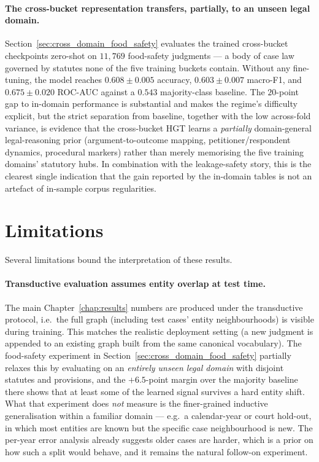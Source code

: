 \paragraph{The cross-bucket representation transfers, partially, to
an unseen legal domain.} Section~\ref{sec:cross_domain_food_safety}
evaluates the trained cross-bucket checkpoints zero-shot on
$11{,}769$ food-safety judgments --- a body of case law governed by
statutes none of the five training buckets contain.  Without any
fine-tuning, the model reaches $0.608\pm0.005$ accuracy,
$0.603\pm0.007$ macro-F1, and $0.675\pm0.020$ ROC-AUC against a
$0.543$ majority-class baseline.  The $20$-point gap to in-domain
performance is substantial and makes the regime's difficulty
explicit, but the strict separation from baseline, together with the
low across-fold variance, is evidence that the cross-bucket HGT
learns a \emph{partially} domain-general legal-reasoning prior
(argument-to-outcome mapping, petitioner/respondent dynamics,
procedural markers) rather than merely memorising the five training
domains' statutory hubs.  In combination with the leakage-safety
story, this is the clearest single indication that the gain
reported by the in-domain tables is not an artefact of in-sample
corpus regularities.

\section{Limitations}

Several limitations bound the interpretation of these results.

\paragraph{Transductive evaluation assumes entity overlap at test
time.} The main Chapter~\ref{chap:results} numbers are produced
under the transductive protocol, i.e.\ the full graph (including
test cases' entity neighbourhoods) is visible during training.  This
matches the realistic deployment setting (a new judgment is appended
to an existing graph built from the same canonical vocabulary).  The
food-safety experiment in
Section~\ref{sec:cross_domain_food_safety} partially relaxes this by
evaluating on an \emph{entirely unseen legal domain} with disjoint
statutes and provisions, and the $+6.5$-point margin over the
majority baseline there shows that at least some of the learned
signal survives a hard entity shift.  What that experiment does
\emph{not} measure is the finer-grained inductive generalisation
within a familiar domain --- e.g.\ a calendar-year or court
hold-out, in which most entities are known but the specific case
neighbourhood is new.  The per-year error analysis already suggests
older cases are harder, which is a prior on how such a split would
behave, and it remains the natural follow-on experiment.


